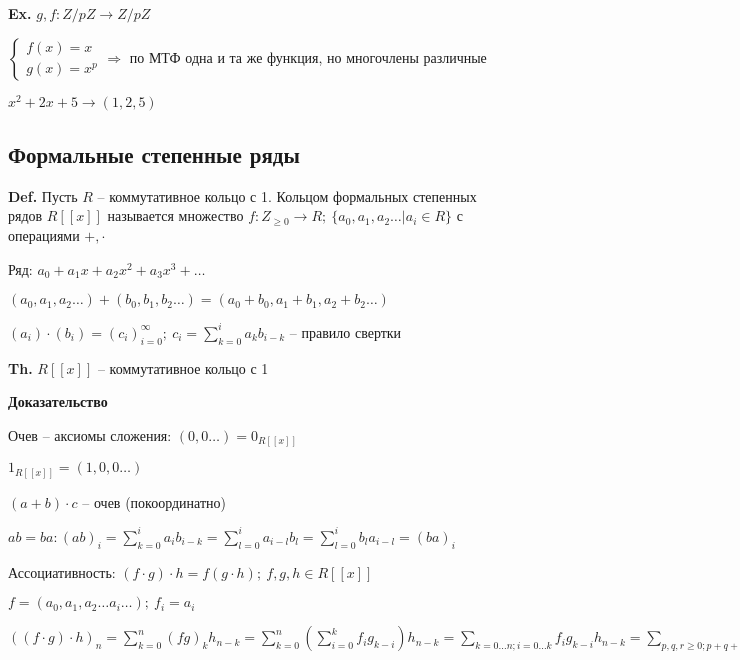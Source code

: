 \documentclass[14pt, letter paper]{article}
\begin{document}
\textbf{Ex.} $g, f : Z/pZ \rightarrow Z/pZ$

$\begin{cases}
    f(x) = x \\
    g(x) = x^p
\end{cases} \Rightarrow$ по МТФ одна и та же функция, но многочлены различные

$x^2 + 2x + 5 \rightarrow (1, 2, 5)$

\subsection*{Формальные степенные ряды}

\textbf{Def.} Пусть $R$ -- коммутативное кольцо с 1. Кольцом формальных степенных рядов $R[[x]]$ называется множество $f : Z_{\geq 0} \rightarrow R;\ \{a_0, a_1, a_2 \ldots | a_i \in R\}$ с операциями $+, \cdot$

Ряд: $a_0 + a_1x + a_2x^2 + a_3x^3 + \ldots$

$(a_0, a_1, a_2 \ldots) + (b_0, b_1, b_2 \ldots) = (a_0 + b_0, a_1 + b_1, a_2 + b_2 \ldots)$

$(a_i) \cdot (b_i) = (c_i)^\infty_{i = 0};\ c_i = \sum\limits_{k = 0}^i a_kb_{i-k}$ -- правило свертки

\textbf{Th.} $R[[x]]$ -- коммутативное кольцо с 1

\begin{center}
    \textbf{Доказательство}
\end{center}

Очев -- аксиомы сложения: $(0, 0 \ldots) = 0_{R[[x]]}$

$1_{R[[x]]} = (1, 0, 0 \ldots)$

$(a + b) \cdot c$ -- очев (покоординатно)

$ab = ba: (ab)_i = \sum\limits_{k = 0}^i a_ib_{i-k} = \sum\limits_{l = 0}^i a_{i-l}b_l = \sum\limits_{l = 0}^i b_la_{i-l} = (ba)_i$

Ассоциативность: $(f \cdot g) \cdot h = f(g \cdot h);\ f, g, h \in R[[x]]$

$f = (a_0, a_1, a_2 \ldots a_i \ldots);\ f_i = a_i$

$((f \cdot g) \cdot h)_n = \sum\limits_{k = 0}^n (fg)_k h_{n-k} = \sum\limits_{k=0}^n(\sum\limits_{i=0}^k f_ig_{k-i})h_{n-k} = \sum\limits_{k = 0 \ldots n ; i = 0 \ldots k} f_i g_{k-i} h_{n-k} = \sum\limits_{p, q, r \geq 0 ; p + q + r = n} (f_p g_q) h_r = \sum\limits_{p, q, r \geq 0 ; p + q + r = n} f_p(g_q h_r) = \sum\limits_{p, q, r \geq 0 ; p + q \leq n} f_p(g_q h_{n-p-q}) = \sum\limits_{r = 0}^n f_p(\sum\limits_{q = 0}^p g_q h_{(n-p)-q}) = \sum\limits f_p (gh)_{n-p} = (f(gh))_n$
\end{document}
